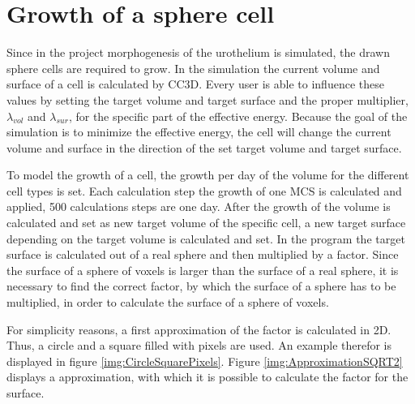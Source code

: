 \section{Growth of a sphere cell}\label{sec:GrowSphereCell}
Since in the project morphogenesis of the urothelium is simulated, the drawn sphere cells are required to grow. \newline
In the simulation the current volume and surface of a cell is calculated by \ac{CC3D}. Every user is able to influence these values by setting the target volume and target surface and the proper multiplier, $\lambda_{vol}$ and $\lambda_{sur}$, for the specific part of the effective energy. Because the goal of the simulation is to minimize the effective energy, the cell will change the current volume and surface in the direction of the set target volume and target surface. 

To model the growth of a cell, the growth per day of the volume for the different cell types is set. Each calculation step the growth of one \ac{MCS} is calculated and applied, 500 calculations steps are one day. After the growth of the volume is calculated and set as new target volume of the specific cell, a new target surface depending on the target volume is calculated and set. \newline
In the program the target surface is calculated out of a real sphere and then multiplied by a factor.
Since the surface of a sphere of voxels is larger than the surface of a real sphere, it is necessary to find the correct factor, by which the surface of a sphere has to be multiplied, in order to calculate the surface of a sphere of voxels. 

For simplicity reasons, a first approximation of the factor is calculated in 2D. Thus, a circle and a square filled with pixels are used. An example therefor is displayed in figure \ref{img:CircleSquarePixels}. \newline
Figure \ref{img:ApproximationSQRT2} displays a approximation, with which it is possible to calculate the factor for the surface. 

